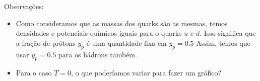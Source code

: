 Observações:
\begin{itemize}
	\item Como consideramos que as massas dos quarks são as mesmas, temos densidades e potenciais químicos iguais para o quarks $u$ e $d$. Isso significa que a fração de prótons $y_p$ é uma quantidade fixa em $y_p = 0.5$ Assim, temos que usar $y_p = 0.5$ para os hádrons também.
	\item Para o caso $T = 0$, o que poderíamos variar para fazer um gráfico? 
\end{itemize}